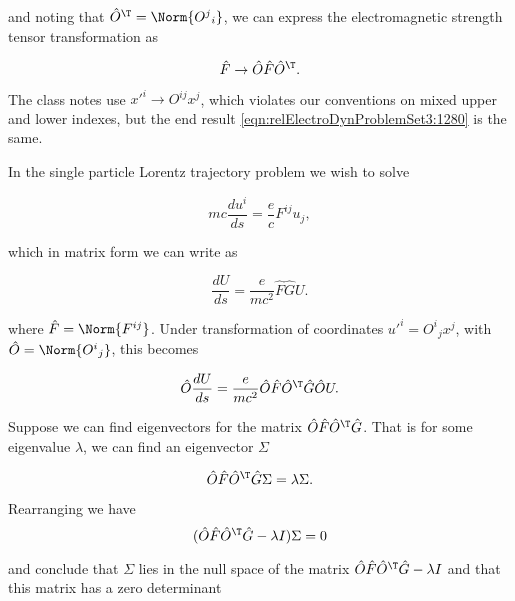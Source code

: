 and noting that $\hat{O}^\T = \Norm{{O^j}_i}$, we can express the electromagnetic strength tensor transformation as

\begin{equation}\label{eqn:relElectroDynProblemSet3:1280}
\hat{F} \rightarrow \hat{O} \hat{F} \hat{O}^\T.
\end{equation}

The class notes use ${x'}^i \rightarrow O^{ij} x^j$, which violates our conventions on mixed upper and lower indexes, but the end result \ref{eqn:relElectroDynProblemSet3:1280} is the same.

In the single particle Lorentz trajectory problem we wish to solve 

\begin{equation}\label{eqn:relElectroDynProblemSet3:1500}
m c \frac{du^i}{ds} = \frac{e}{c} F^{i j} u_j,
\end{equation}

which in matrix form we can write as

\begin{equation}\label{eqn:relElectroDynProblemSet3:1520}
\frac{d U}{ds} = \frac{e}{m c^2} \hat{F} \hat{G} U.
\end{equation}

where $\hat{F} = \Norm{F^{i j}}$.  Under transformation of coordinates ${u'}^i = {O^i}_j x^j$, with $\hat{O} = \Norm{{O^i}_j}$, this becomes

\begin{equation}\label{eqn:relElectroDynProblemSet3:1540}
\hat{O} \frac{d U}{ds} = \frac{e}{m c^2} \hat{O} \hat{F} \hat{O}^\T \hat{G} \hat{O} U.
\end{equation}

Suppose we can find eigenvectors for the matrix $\hat{O} \hat{F} \hat{O}^\T \hat{G}$.  That is for some eigenvalue $\lambda$, we can find an eigenvector $\Sigma$

\begin{equation}\label{eqn:relElectroDynProblemSet3:1560}
\hat{O} \hat{F} \hat{O}^\T \hat{G} \Sigma = \lambda \Sigma.
\end{equation}

Rearranging we have
\begin{equation}\label{eqn:relElectroDynProblemSet3:1580}
(\hat{O} \hat{F} \hat{O}^\T \hat{G} - \lambda I) \Sigma = 0
\end{equation}

and conclude that $\Sigma$ lies in the null space of the matrix $\hat{O} \hat{F} \hat{O}^\T \hat{G} - \lambda I$ and that this matrix has a zero determinant

